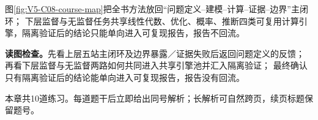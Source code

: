 图\ref{fig:V5-C08-course-map}把全书方法放回“问题定义--建模--计算--证据--边界”主闭环；
下层监督与无监督任务共享线性代数、优化、概率、推断四类可复用计算引擎，隔离验证后的结论只能单向进入可复现报告，报告不回流。

\FloatBarrier
\noindent\textbf{读图检查。}先看上层五站主闭环及边界暴露／证据失败后返回问题定义的反馈；
再看下层监督与无监督两路如何共同进入共享引擎池并汇入隔离验证；
最终确认只有隔离验证后的结论能单向进入可复现报告，报告没有回流。

\label{struct:V5-C08-CH33}
\label{struct:V5-C08-CH34}
\begin{chapterexercisebox}
\label{struct:V5-C08-CH35}
本章共10道练习。每道题干后立即给出同号解析；长解析可自然跨页，续页标题保留题号。
\end{chapterexercisebox}

